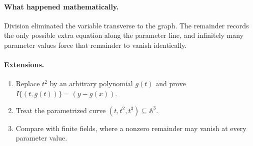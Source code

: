 \paragraph{What happened mathematically.}
Division eliminated the variable transverse to the graph.  The remainder records the only
possible extra equation along the parameter line, and infinitely many parameter values
force that remainder to vanish identically.

\paragraph{Extensions.}
\begin{enumerate}
\item Replace \(t^2\) by an arbitrary polynomial \(g(t)\) and prove
      \(I\{(t,g(t))\}=(y-g(x))\).
\item Treat the parametrized curve \((t,t^2,t^3)\subseteq\mathbb A^3\).
\item Compare with finite fields, where a nonzero remainder may vanish at every parameter
      value.
\end{enumerate}
\fi
